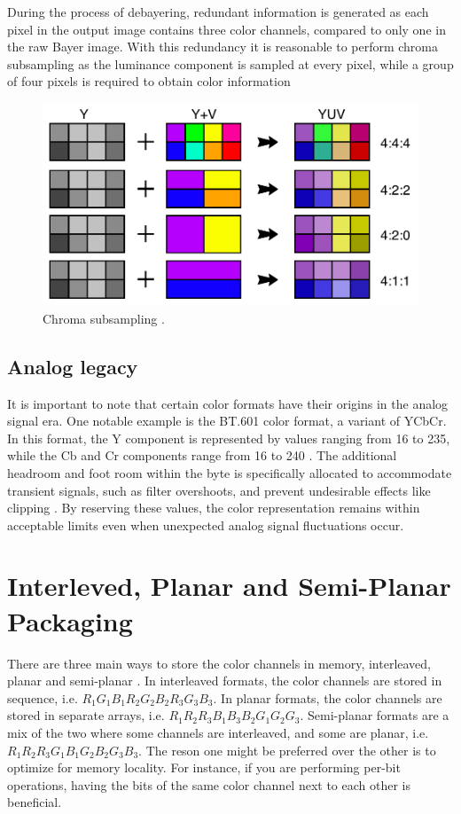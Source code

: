 During the process of debayering, redundant information is generated as each pixel in the output image contains three color channels, compared to only one in the raw Bayer image.
With this redundancy it is reasonable to perform chroma subsampling as the luminance component is sampled at every pixel, while a group of four pixels is required to obtain color information

\begin{figure}[H]
    \centering
    \includegraphics[width=.6\textwidth]{figures/debayer/chroma_subsampling.pdf}
    \caption{Chroma subsampling \cite{stevo-88EnglishMostWidely2010}.}
    \label{fig:chroma_subsampling}
\end{figure}


\subsection{Analog legacy}
It is important to note that certain color formats have their origins in the analog signal era.
One notable example is the BT.601 color format, a variant of YCbCr.
In this format, the Y component is represented by values ranging from 16 to 235, while the Cb and Cr components range from 16 to 240 \cite{YCbCr2023}.
The additional headroom and foot room within the byte is specifically allocated to accommodate transient signals, such as filter overshoots, and prevent undesirable effects like clipping \cite{Rec6012023}.
By reserving these values, the color representation remains within acceptable limits even when unexpected analog signal fluctuations occur.


\section{Interleved, Planar and Semi-Planar Packaging}
There are three main ways to store the color channels in memory, interleaved, planar and semi-planar \cite{baranYUVFormats2018}.
In interleaved formats, the color channels are stored in sequence, i.e.
$R_1 G_1 B_1 R_2 G_2 B_2 R_3 G_3 B_3$.
In planar formats, the color channels are stored in separate arrays, i.e.
$R_1 R_2 R_3 B_1 B_3 B_2 G_1 G_2 G_3$.
Semi-planar formats are a mix of the two where some channels are interleaved, and some are planar, i.e.
$R_1 R_2 R_3 G_1 B_1 G_2 B_2 G_3 B_3$.
The reson one might be preferred over the other is to optimize for memory locality.
For instance, if you are performing per-bit operations, having the bits of the same color channel next to each other is beneficial.

